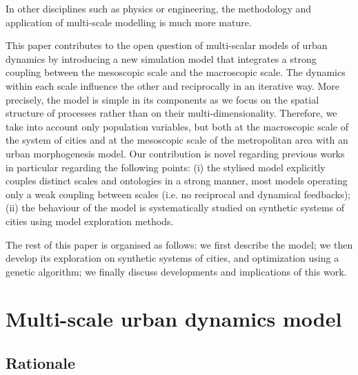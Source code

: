 \documentclass[referee,lineno,pdflatex,sn-apa]{sn-jnl}
\begin{document}
In other disciplines such as physics or engineering, the methodology and application of multi-scale modelling is much more mature.



This paper contributes to the open question of multi-scalar models of urban dynamics by introducing a new simulation model that integrates a strong coupling between the mesoscopic scale and the macroscopic scale. The dynamics within each scale influence the other and reciprocally in an iterative way. More precisely, the model is simple in its components as we focus on the spatial structure of processes rather than on their multi-dimensionality. Therefore, we take into account only population variables, but both at the macroscopic scale of the system of cities and at the mesoscopic scale of the metropolitan area with an urban morphogenesis model. Our contribution is novel regarding previous works in particular regarding the following points: (i) the stylised model explicitly couples distinct scales and ontologies in a strong manner, most models operating only a weak coupling between scales (i.e. no reciprocal and dynamical feedbacks); (ii) the behaviour of the model is systematically studied on synthetic systems of cities using model exploration methods.
 
 
The rest of this paper is organised as follows: we first describe the model; we then develop its exploration on synthetic systems of cities, and optimization using a genetic algorithm; we finally discuss developments and implications of this work.


\section{Multi-scale urban dynamics model}

\subsection{Rationale}
\end{document}
